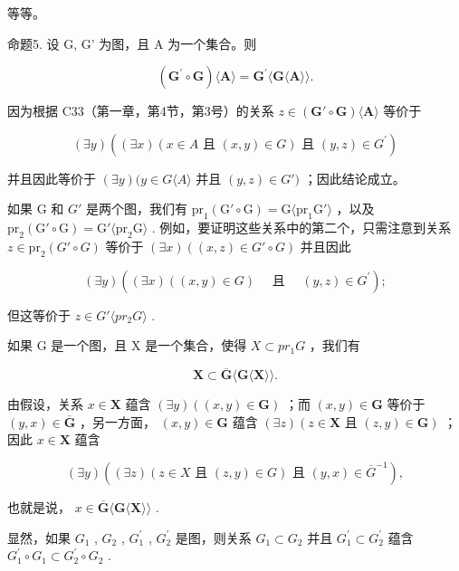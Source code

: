 等等。

命题5. 设 G, G' 为图，且 A 为一个集合。则

\[
(\mathbf {G} ^ {\prime} \circ \mathbf {G}) \langle \mathbf {A} \rangle = \mathbf {G} ^ {\prime} \langle \mathbf {G} \langle \mathbf {A} \rangle \rangle .
\]

因为根据 C33（第一章，第4节，第3号）的关系 \(z \in (\mathbf{G}' \circ \mathbf{G})\langle \mathbf{A} \rangle\) 等价于

\[
(\exists y) ((\exists x) (x \in A \text {   且   } (x, y) \in G) \text {   且   } (y, z) \in G ^ {\prime})
\]

并且因此等价于 \((\exists y)(y \in G \langle A \rangle\) 并且 \((y, z) \in G')\) ；因此结论成立。

如果 G 和 \(G'\) 是两个图，我们有 \(\mathrm{pr}_{1}(\mathrm{G}' \circ \mathrm{G}) = \mathrm{G}\langle\mathrm{pr}_{1}\mathrm{G}'\rangle\) ，以及 \(\mathrm{pr}_{2}(\mathrm{G}' \circ \mathrm{G}) = \mathrm{G}'\langle\mathrm{pr}_{2}\mathrm{G}\rangle\) . 例如，要证明这些关系中的第二个，只需注意到关系 \(z \in \mathrm{pr}_2(G' \circ G)\) 等价于 \((\exists x)((x, z) \in G' \circ G)\) 并且因此

\[
(\exists y) ((\exists x) ((x, y) \in G) \quad \text { 且 } \quad (y, z) \in G ^ {\prime});
\]

但这等价于 \(z \in G' \langle pr_{2}G \rangle\) .

如果 G 是一个图，且 X 是一个集合，使得 \(X \subset pr_{1}G\) ，我们有

\[
\mathbf {X} \subset \overline {{\mathbf {G}}} \langle \mathbf {G} \langle \mathbf {X} \rangle \rangle .
\]

由假设，关系 \(x \in \mathbf{X}\) 蕴含 \((\exists y)((x, y) \in \mathbf{G})\) ；而 \((x, y) \in \mathbf{G}\) 等价于 \((y, x) \in \overline{\mathbf{G}}\) ，另一方面， \((x, y) \in \mathbf{G}\) 蕴含 \((\exists z)(z \in \mathbf{X} \text{ 且 } (z, y) \in \mathbf{G})\) ；因此 \(x \in \mathbf{X}\) 蕴含

\[
(\exists y) ((\exists z) (z \in X \text { 且 } (z, y) \in G) \text { 且 } (y, x) \in \overline {{G}} ^ {- 1}),
\]

也就是说， \(x \in \overline{\mathbf{G}}\langle \mathbf{G}\langle \mathbf{X}\rangle\rangle\) .

显然，如果 \(G_{1}\) , \(G_{2}\) , \(G_{1}^{\prime}\) , \(G_{2}^{\prime}\) 是图，则关系 \(G_{1} \subset G_{2}\) 并且 \(G_{1}^{\prime} \subset G_{2}^{\prime}\) 蕴含 \(G_{1}^{\prime} \circ G_{1} \subset G_{2}^{\prime} \circ G_{2}\) .

